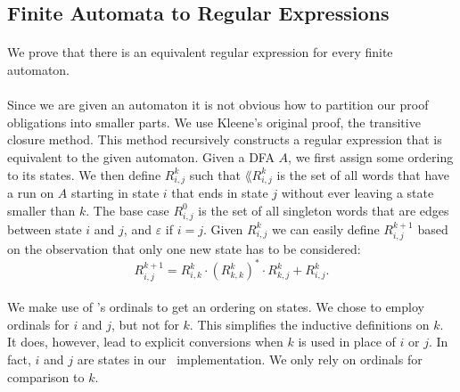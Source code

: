 \documentclass[11pt,a4paper,oneside]{book}
\begin{document}
            \subsection{Finite Automata to Regular Expressions}
                \paragraph{}
                    We prove that there is an equivalent regular expression for every finite automaton.

                
                \paragraph{}
                    Since we are given an automaton it is not obvious how to partition our proof obligations into smaller parts.
                    We use Kleene's original proof, the transitive closure method. 
                    This method recursively constructs a regular expression that is equivalent to the given automaton.
                    Given a DFA $A$, we first assign some ordering to its states. We then define $R^k_{i,j}$ such that 
                    $\lang{R^k_{i,j}}$ is the set of all words that have a run on $A$ starting in state $i$ that ends in state $j$ without ever leaving a state smaller than $k$. 
                    The base case $R^{0}_{i,j}$ is the set of all singleton words that are edges between state $i$ and $j$, and $\varepsilon$ if $i=j$. 
                    Given $R^k_{i,j}$ we can easily define $R^{k+1}_{i,j}$ based on the observation that only one new state has to be considered:
                    \[
                        R^{k+1}_{i,j} = R^{k}_{i,k} \cdot (R^{k}_{k,k})^* \cdot R^{k}_{k,j} + R^{k}_{i,j}.
                    \]
                    \paragraph{}
                        We make use of \ssreflect's ordinals to get an ordering on states. 
                        We chose to employ ordinals for $i$ and $j$, but not for $k$. 
                        This simplifies the inductive definitions on $k$. 
                        It does, however, lead to explicit conversions when $k$ is used in place of $i$ or $j$.
                        In fact, $i$ and $j$ are states in our \coq\ implementation. 
                        We only rely on ordinals for comparison to $k$.
\end{document}
